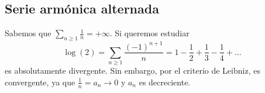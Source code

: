 \subsection{Serie armónica alternada}
Sabemos que $\sum_{n\geq 1} \frac{1}{n} =+\infty$. Si queremos estudiar
\begin{equation}
    \log\left( 2 \right) = \sum_{n\geq 1} \frac{\left( -1 \right) ^{n + 1}}{n} = 1 - \frac{1}{2} + \frac{1}{3} - \frac{1}{4} + \ldots
\end{equation}
es absolutamente divergente. Sin embargo, por el criterio de Leibniz, es convergente, ya que $\frac{1}{n} = a_n \to 0$ y $a_n$ es decreciente.
